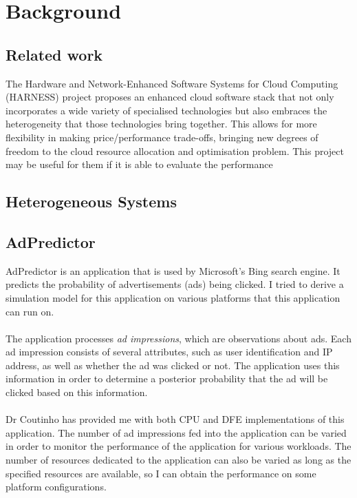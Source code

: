 \documentclass[a4paper,11pt]{article}
\begin{document}
\section{Background}

\subsection{Related work}
The Hardware and Network-Enhanced Software Systems for Cloud Computing (HARNESS)\cite{harness} project proposes an enhanced cloud software stack that not only incorporates a wide variety of specialised technologies but also embraces the heterogeneity that those technologies bring together. This allows for more flexibility in making price/performance trade-offs, bringing new degrees of freedom to the cloud resource allocation and optimisation problem. This project may be useful for them if it is able to evaluate the performance 

\subsection{Heterogeneous Systems}

\subsection{AdPredictor}
AdPredictor is an application that is used by Microsoft's Bing search engine. It predicts the probability of advertisements (ads) being clicked. I tried to derive a simulation model for this application on various platforms that this application can run on.
\\\\
The application processes \textit{ad impressions}, which are observations about ads. Each ad impression consists of several attributes, such as user identification and IP address, as well as whether the ad was clicked or not. The application uses this information in order to determine a posterior probability that the ad will be clicked based on this information.
\\\\
Dr Coutinho has provided me with both CPU and DFE implementations of this application. The number of ad impressions fed into the application can be varied in order to monitor the performance of the application for various workloads. The number of resources dedicated to the application can also be varied as long as the specified resources are available, so I can obtain the performance on some platform configurations. 
\end{document}

